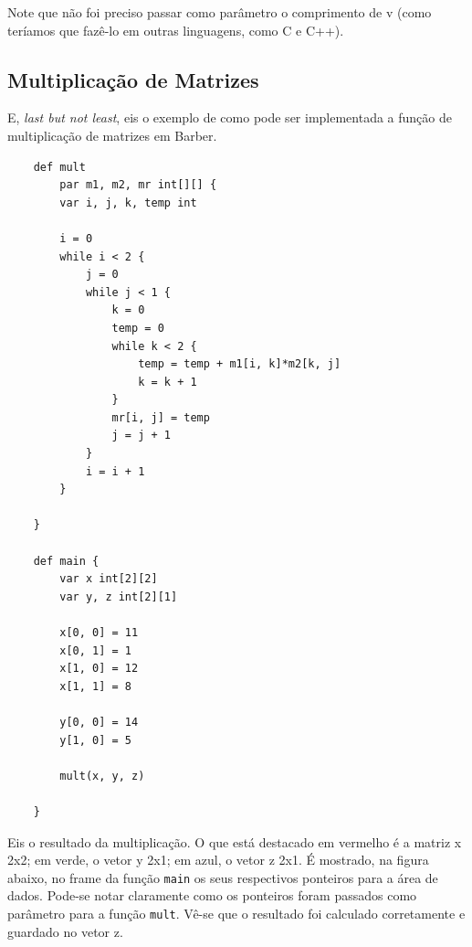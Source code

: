 \documentclass[a4paper,12pt]{report}
\begin{document}
    Note que não foi preciso passar como parâmetro o comprimento de v (como teríamos que fazê-lo em outras linguagens, como C e C++).

    \newpage
    \subsection*{Multiplicação de Matrizes}
    E, \textit{last but not least}, eis o exemplo de como pode ser implementada a função de multiplicação de matrizes em Barber.

    \begin{lstlisting}
    def mult
        par m1, m2, mr int[][] {
        var i, j, k, temp int

        i = 0
        while i < 2 {
            j = 0
            while j < 1 {
                k = 0
                temp = 0
                while k < 2 {
                    temp = temp + m1[i, k]*m2[k, j]
                    k = k + 1
                }
                mr[i, j] = temp
                j = j + 1
            }
            i = i + 1
        }

    }

    def main {
        var x int[2][2]
        var y, z int[2][1]

        x[0, 0] = 11
        x[0, 1] = 1
        x[1, 0] = 12
        x[1, 1] = 8

        y[0, 0] = 14
        y[1, 0] = 5

        mult(x, y, z)

    }
    \end{lstlisting}

    Eis o resultado da multiplicação. O que está destacado em vermelho é a matriz x 2x2; em verde, o vetor y 2x1; em azul, o vetor z 2x1.
    É mostrado, na figura abaixo, no frame da função \verb|main| os seus respectivos ponteiros para a área de dados.
    Pode-se notar claramente como os ponteiros foram passados como parâmetro para a função \verb|mult|.
    Vê-se que o resultado foi calculado corretamente e guardado no vetor z.
\end{document}
